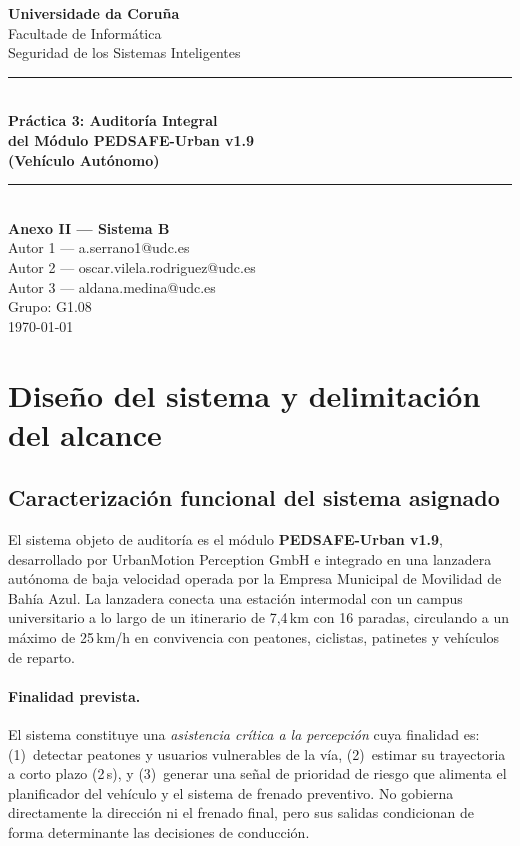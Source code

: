 \documentclass[11pt]{article}
\begin{document}
\begin{titlepage}
\centering
\vspace*{2cm}
{\Large\textbf{Universidade da Coru\~na}\\[0.3cm]}
{\large Facultade de Informática\\[0.2cm]}
{\large Seguridad de los Sistemas Inteligentes\\[1.5cm]}
\rule{\textwidth}{1pt}\\[0.5cm]
{\LARGE\bfseries Práctica 3: Auditoría Integral\\[0.3cm]
del Módulo PEDSAFE-Urban v1.9\\[0.3cm]
(Vehículo Autónomo)}\\[0.5cm]
\rule{\textwidth}{1pt}\\[1.5cm]
{\large\textbf{Anexo II --- Sistema B}\\[1cm]}
{\large
Autor 1 --- a.serrano1@udc.es\\
Autor 2 --- oscar.vilela.rodriguez@udc.es\\
Autor 3 --- aldana.medina@udc.es\\[1cm]
}
{\large Grupo: G1.08\\[1cm]}
{\large \today}
\vfill
\end{titlepage}
\tableofcontents
\newpage

\section{Diseño del sistema y delimitación del alcance}

\subsection{Caracterización funcional del sistema asignado}

El sistema objeto de auditoría es el módulo \textbf{PEDSAFE-Urban v1.9}, desarrollado por UrbanMotion Perception GmbH e integrado en una lanzadera autónoma de baja velocidad operada por la Empresa Municipal de Movilidad de Bahía Azul. La lanzadera conecta una estación intermodal con un campus universitario a lo largo de un itinerario de 7,4\,km con 16 paradas, circulando a un máximo de 25\,km/h en convivencia con peatones, ciclistas, patinetes y vehículos de reparto.

\paragraph{Finalidad prevista.} El sistema constituye una \textit{asistencia crítica a la percepción} cuya finalidad es: (1)~detectar peatones y usuarios vulnerables de la vía, (2)~estimar su trayectoria a corto plazo (2\,s), y (3)~generar una señal de prioridad de riesgo que alimenta el planificador del vehículo y el sistema de frenado preventivo. No gobierna directamente la dirección ni el frenado final, pero sus salidas condicionan de forma determinante las decisiones de conducción.
\end{document}
